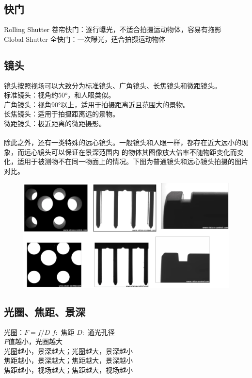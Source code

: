 \documentclass[11pt]{article}
\begin{document}
\subsection{快门}
Rolling Shutter 卷帘快门：逐行曝光，不适合拍摄运动物体，容易有拖影  \\
Global Shutter 全快门：一次曝光，适合拍摄运动物体

\subsection{镜头}
镜头按照视场可以大致分为标准镜头、广角镜头、长焦镜头和微距镜头。\\
标准镜头：视角约50°，和人眼类似。\\
广角镜头：视角90°以上，适用于拍摄距离近且范围大的景物。\\
长焦镜头：适用于拍摄距离远的景物。\\
微距镜头：极近距离的微距摄影。\\
\\
除此之外，还有一类特殊的远心镜头。一般镜头和人眼一样，都存在近大远小的现象，而远心镜头可以保证在景深范围内
的物体其图像放大倍率不随物距变化而变化，适用于被测物不在同一物面上的情况。下图为普通镜头和远心镜头拍摄的图片对比。
\begin{figure}[htb]
    \centering
    \includegraphics[scale=0.1]{imgs/telecentric.png}
\end{figure}

\subsection{光圈、焦距、景深}
光圈：$F=f/D$  \quad\quad $f:$ 焦距  \quad\quad  $D:$ 通光孔径  \\
$F$值越小，光圈越大  \\
光圈越小，景深越大；光圈越大，景深越小  \\
焦距越小，景深越大；焦距越大，景深越小  \\
焦距越小，视场越大；焦距越大，视场越小
\end{document}
